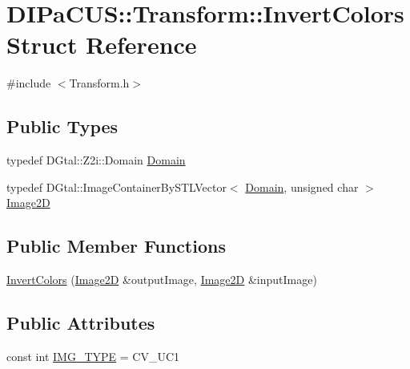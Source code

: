 \hypertarget{structDIPaCUS_1_1Transform_1_1InvertColors}{}\section{D\+I\+Pa\+C\+US\+:\+:Transform\+:\+:Invert\+Colors Struct Reference}
\label{structDIPaCUS_1_1Transform_1_1InvertColors}


{\ttfamily \#include $<$Transform.\+h$>$}

\subsection*{Public Types}
\begin{DoxyCompactItemize}
\item 
typedef D\+Gtal\+::\+Z2i\+::\+Domain \mbox{\hyperlink{structDIPaCUS_1_1Transform_1_1InvertColors_a9527f33d71bce14615e0a39d1cf6058f}{Domain}}
\item 
typedef D\+Gtal\+::\+Image\+Container\+By\+S\+T\+L\+Vector$<$ \mbox{\hyperlink{structDIPaCUS_1_1Transform_1_1InvertColors_a9527f33d71bce14615e0a39d1cf6058f}{Domain}}, unsigned char $>$ \mbox{\hyperlink{structDIPaCUS_1_1Transform_1_1InvertColors_a0520b12f53327b6240a03bd9db4dfda7}{Image2D}}
\end{DoxyCompactItemize}
\subsection*{Public Member Functions}
\begin{DoxyCompactItemize}
\item 
\mbox{\hyperlink{structDIPaCUS_1_1Transform_1_1InvertColors_a2e947f46c2a3790fa5f82b9891deb425}{Invert\+Colors}} (\mbox{\hyperlink{structDIPaCUS_1_1Transform_1_1InvertColors_a0520b12f53327b6240a03bd9db4dfda7}{Image2D}} \&output\+Image, \mbox{\hyperlink{structDIPaCUS_1_1Transform_1_1InvertColors_a0520b12f53327b6240a03bd9db4dfda7}{Image2D}} \&input\+Image)
\end{DoxyCompactItemize}
\subsection*{Public Attributes}
\begin{DoxyCompactItemize}
\item 
const int \mbox{\hyperlink{structDIPaCUS_1_1Transform_1_1InvertColors_a98282fd7c160fa6aa172d4200d920c86}{I\+M\+G\+\_\+\+T\+Y\+PE}} = C\+V\+\_\+U\+C1
\end{DoxyCompactItemize}


